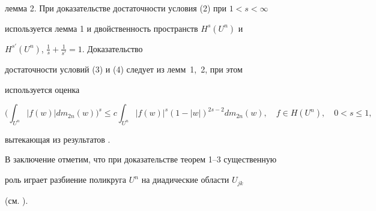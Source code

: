 лемма 2. При доказательстве достаточности условия (2) при $1<s<\infty$ 


используется лемма 1 и двойственность пространств $H^s(U^n)$ и 


$H^{s'}(U^n)$, $\frac{1}{s}+\frac{1}{s'}=1$. Доказательство 


достаточности условий (3) и (4) следует из лемм~1,~2, при этом 


используется оценка 


$$ 


\bigg(\int_{U^n}|f(w)|d m_{2n}(w)\bigg)^s\le c 


\int_{U^n}|f(w)|^s(1-|w|)^{2s-2}d m_{2n}(w),\quad 


f\in H(U^n),\quad 0<s\le1, 


$$ 


вытекающая из результатов \cite{1}. 


 


В заключение отметим, что при доказательстве теорем 1--3 существенную 


роль играет разбиение поликруга $U^n$ на диадические области $U_{j k}$ 


(см. \cite{1}). 


 


 


